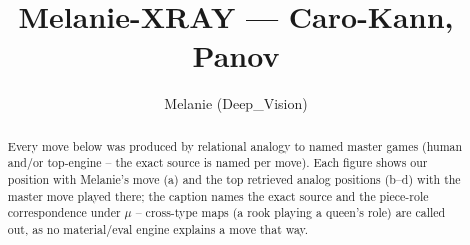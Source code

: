 \documentclass[11pt]{article}
\title{Melanie-XRAY — Caro-Kann, Panov}
\author{Melanie (Deep\_Vision)}
\date{}
\begin{document}
\maketitle

\begin{abstract}Every move below was produced by relational analogy to named master games (human and/or top-engine -- the exact source is named per move). Each figure shows our position with Melanie's move (a) and the top retrieved analog positions (b--d) with the master move played there; the caption names the exact source and the piece-role correspondence under $\mu$ -- cross-type maps (a rook playing a queen's role) are called out, as no material/eval engine explains a move that way.\end{abstract}

\begin{figure}[p]\centering
\begin{subfigure}{0.46\textwidth}\centering
\resizebox{\linewidth}{!}{%
\newchessgame
\chessboard[
  setfen={rnbqk2r/pp2bppp/4pn2/2Pp4/3P4/2N2N2/PP3PPP/R1BQKB1R b KQkq - 0 7},
  showmover=false,
  pgfstyle=straightmove, color=movearrow, markmove={e8-g8}
]}
\caption{}
\end{subfigure}\hfill
\begin{subfigure}{0.46\textwidth}\centering
\resizebox{\linewidth}{!}{%
\newchessgame
\chessboard[
  setfen={r1bqkb1r/pp3ppp/2n2n2/2pp4/3P4/4PN2/PP2BPPP/RNBQK2R w KQkq - 2 7},
  showmover=false,
  pgfstyle=straightmove, color=movearrow, markmove={e1-g1}
]}
\caption{}
\end{subfigure}
\\[4pt]
\begin{subfigure}{0.46\textwidth}\centering
\resizebox{\linewidth}{!}{%
\newchessgame
\chessboard[
  setfen={r1bqkb1r/pp3ppp/2n2n2/2pp4/3P4/5NP1/PP2PPBP/RNBQK2R w KQkq - 3 7},
  showmover=false,
  pgfstyle=straightmove, color=movearrow, markmove={e1-g1}
]}
\caption{}
\end{subfigure}\hfill
\begin{subfigure}{0.46\textwidth}\centering
\resizebox{\linewidth}{!}{%
\newchessgame
\chessboard[
  setfen={r1bqkb1r/pp3ppp/2n2n2/2pp4/3P4/5NP1/PP2PPBP/RNBQK2R w KQkq - 3 7},
  showmover=false,
  pgfstyle=straightmove, color=movearrow, markmove={e1-g1}
]}
\caption{}
\end{subfigure}

\end{figure}
\end{document}
